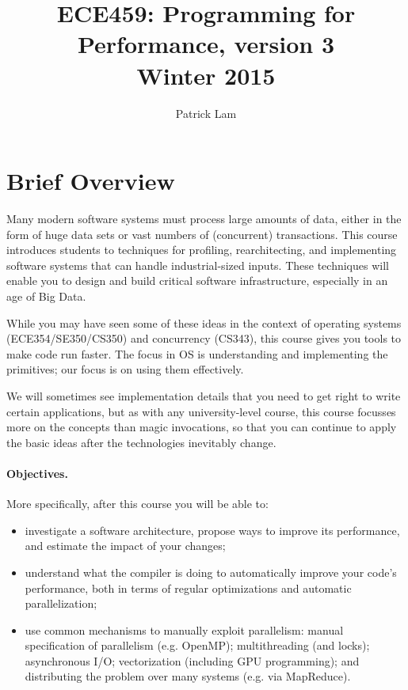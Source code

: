 \documentclass{article}
\begin{document}
\title{ECE459: Programming for Performance, version 3\\Winter 2015}
\author{Patrick Lam}
\renewcommand{\today}{}
\maketitle
\vspace*{-2em}

\section*{Brief Overview}

Many modern software systems must process large amounts of data, either in the
form of huge data sets or vast numbers of (concurrent) transactions.  This
course introduces students to techniques for profiling, rearchitecting, and
implementing software systems that can handle industrial-sized
inputs. These techniques will enable you to design and build
critical software infrastructure, especially in an age of Big Data.

While you may have seen some of these ideas in the context of
operating systems (ECE354/SE350/CS350) and concurrency (CS343), this course gives you tools to make code run
faster. The focus in OS is understanding and implementing the
primitives; our focus is on using them effectively. 

We will sometimes see implementation details that you need to get right to write
certain applications, but as with any university-level course, this course
focusses more on the concepts than magic invocations, so that you can continue
to apply the basic ideas after the technologies inevitably change.


\paragraph{Objectives.} More specifically, after this course you will be able to:
\begin{itemize}
\item investigate a software architecture, propose ways to improve its performance, and estimate the impact of your changes; 
\item understand what the compiler is doing to automatically improve
  your code's performance, both in terms of regular optimizations and
  automatic parallelization;
\item use common mechanisms to manually exploit parallelism: manual
  specification of parallelism (e.g. OpenMP); multithreading (and
  locks); asynchronous I/O; vectorization (including GPU programming); and distributing
  the problem over many systems (e.g. via MapReduce).
\end{itemize}
\end{document}
